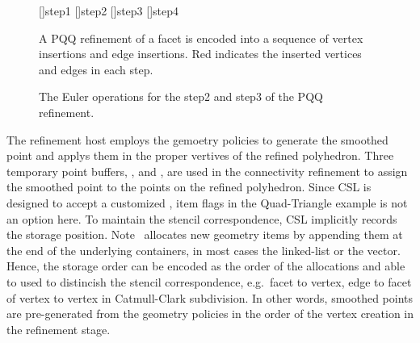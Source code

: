 \begin{figure}
  \centering 
  []{step1}
  []{step2}
  []{step3}
  []{step4}
  \caption{A PQQ refinement of a facet is encoded into a sequence of
  vertex insertions and edge insertions. Red indicates the inserted
  vertices and edges in each step.}
  \label{fig:CCRefinement}
  \vspace{0.6cm}
  \caption{The Euler operations for the step2 and step3 of 
  the PQQ refinement.}
  \label{fig:CCRefinementStep23}
\end{figure}

The refinement host employs the gemoetry policies
to generate the smoothed point and applys them in the
proper vertives of the refined polyhedron. Three temporary
point buffers, , 
 and , 
are used in the connectivity refinement to
assign the smoothed point to the points on the refined
polyhedron. Since CSL is designed
to accept a customized \cgalpoly , item flags in the 
Quad-Triangle example is not an option here.
To maintain the stencil correspondence, CSL implicitly
records the storage position. Note \cgalpoly\ allocates new
geometry items by appending them at the end of the underlying
containers, in most cases the linked-list or the vector.
Hence, the storage order can be encoded as the order of
the allocations and able to used to distincish the
stencil correspondence, e.g.\ facet to vertex, edge to facet
of vertex to vertex in Catmull-Clark subdivision.
In other words, smoothed points are pre-generated 
from the geometry policies in the order of the vertex
creation in the refinement stage. 
